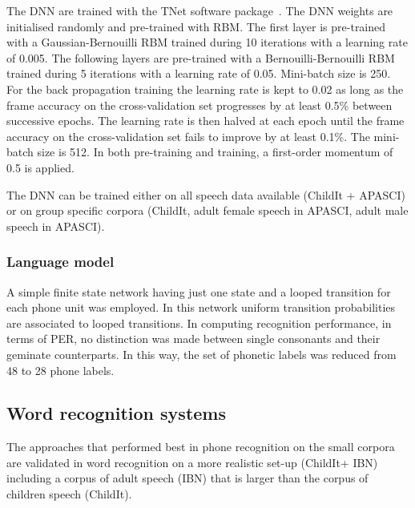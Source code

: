 \documentclass{nle}
\begin{document}
The DNN are trained with the TNet software package~\citep*{vesely10}. The DNN weights are initialised randomly and pre-trained with RBM. The first layer is pre-trained with a Gaussian-Bernouilli RBM trained during 10 iterations with a learning rate of 0.005. The following layers are pre-trained with a Bernouilli-Bernouilli RBM trained during 5 iterations with a learning rate of 0.05. Mini-batch size is 250. For the back propagation training the learning rate is kept to 0.02 as long as the frame accuracy on the cross-validation set progresses by at least 0.5\% between successive epochs. The learning rate is then halved at each epoch until the frame accuracy on the cross-validation set fails to improve by at least 0.1\%. The mini-batch size is 512. In both pre-training and training, a first-order momentum of 0.5 is applied.

The DNN can be trained either on all speech data available  (ChildIt + APASCI) or on group specific corpora (ChildIt, adult female speech in APASCI, adult male speech in APASCI).

\subsubsection{Language model}
A simple finite state network having  just one state and a  looped transition for each
phone  unit   was  employed.   In  this   network  uniform  transition
probabilities  are  associated to  looped  transitions.  In  computing
recognition  performance,  in terms  of  PER,  no
distinction  was made  between  single consonants  and their  geminate
counterparts.  In this way, the  set of phonetic labels was reduced
from 48 to 28 phone labels.  




\subsection{Word recognition systems}
The approaches that performed best in phone recognition on the small corpora are validated in word recognition on a more realistic set-up (ChildIt+ IBN) including a corpus of adult speech (IBN) that is larger than the corpus of children speech (ChildIt).
\end{document}
